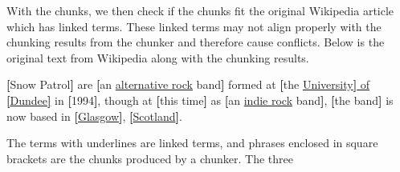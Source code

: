 With the chunks, we then check if the chunks fit
the original Wikipedia article which has linked terms.
These linked terms may not align properly with
the chunking results from the chunker and therefore cause conflicts.
Below is the original text from Wikipedia along with the chunking
results.
\myskip
\begin{example}
\label{ex:snow-links}
{\textbf{[}Snow Patrol\textbf{]}} are
{\textbf{[}an {\color{blue}\uline{alternative rock}} band\textbf{]}}
formed at {\textbf{[}the {\color{blue}\uline{University{\color{black}\textbf{]}} of {\color{black}\textbf{[}}Dundee{\color{black}\textbf{]}}}}} in {\textbf{[}1994\textbf{]}}, though at {\textbf{[}this time\textbf{]}} as {\textbf{[}an {\color{blue}\uline{indie rock}} band\textbf{]}}, {\textbf{[}the band\textbf{]}} is now based in {\textbf{[}{\color{blue}\uline{Glasgow}}\textbf{]}}, {\textbf{[}{\color{blue}\uline{Scotland}}\textbf{]}}.
\end{example}
\myskip
The terms with underlines are linked terms, and phrases enclosed in
square brackets are the chunks produced by a chunker. The three
